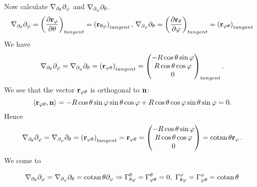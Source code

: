 \documentclass[12pt]{article}
\theoremstyle{theorem}
\numberwithin{equation}{section}
\begin{document}
Now calculate $\nabla_{\partial_\theta}\partial_\varphi$ and $\nabla_{\partial_\varphi}\partial_\theta$.
\begin{equation*}
    \nabla_{\partial_\theta}\partial_\varphi=\left({\partial {\bf r}_\varphi\over \partial\theta}\right)_{tangent}=
    \left({\bf r}_{\theta\varphi}\right)_{tangent},\,
    \nabla_{\partial_\varphi}\partial_\theta=\left({\partial {\bf r}_\theta\over \partial\varphi}\right)_{tangent}=
    \left({\bf r}_{\varphi\theta}\right)_{tangent}
\end{equation*}
 We have
           $$
           \nabla_{\partial_\theta}\partial_\varphi=\nabla_{\partial_\varphi}\partial_\theta=\left({\bf r}_{\varphi\theta}\right)_{tangent}=
           \begin{pmatrix}
            -R\cos\theta\sin\varphi\cr
            R\cos\theta\cos\varphi\cr
            0\cr
                  \end{pmatrix}_{tangent}.
           $$
We see that the vector ${\bf r}_{\varphi\theta}$ is orthogonal to ${\bf n}$:
\begin{equation*}
     \langle{\bf r}_{\varphi\theta},{\bf n}\rangle=-R\cos\theta\sin\varphi \sin\theta\cos\varphi+
     R\cos\theta\cos\varphi\sin\theta\sin\varphi=0.
\end{equation*}
Hence
\begin{equation*}
 \nabla_{\partial_\theta}\partial_\varphi=\nabla_{\partial_\varphi}\partial_\theta=
 \left({\bf r}_{\varphi\theta}\right)_{tangent}={\bf r}_{\varphi\theta}=
 \begin{pmatrix}
            -R\cos\theta\sin\varphi\cr
            R\cos\theta\cos\varphi\cr
            0\cr
                  \end{pmatrix}=
                  {\rm cotan\,}\theta  {\bf r}_\varphi\,.
\end{equation*}
We come to

\begin{equation}\label{inducedonsphere8}
    \nabla_{\partial_\theta}\partial_\varphi=\nabla_{\partial_\varphi}\partial_\theta={\rm cotan\,}\theta  \partial_\varphi \Rightarrow
    \Gamma^\theta_{\theta\varphi}=\Gamma^\theta_{\varphi\theta}=0,\,\,
    \Gamma^\varphi_{\theta\varphi}=\Gamma^\varphi_{\varphi\theta}={\rm cotan\,}\theta
\end{equation}
\end{document}
